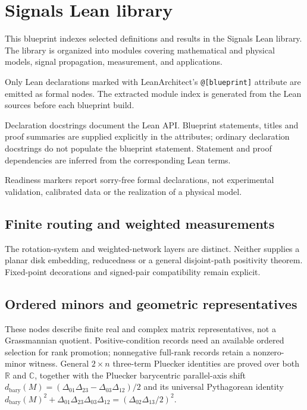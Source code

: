 \chapter{Signals Lean library}

This blueprint indexes selected definitions and results in the Signals Lean
library. The library is organized into modules covering mathematical and
physical models, signal propagation, measurement, and applications.

Only Lean declarations marked with LeanArchitect's \texttt{@[blueprint]}
attribute are emitted as formal nodes. The extracted module index is generated
from the Lean sources before each blueprint build.

Declaration docstrings document the Lean API. Blueprint statements, titles and
proof summaries are supplied explicitly in the attributes; ordinary declaration
docstrings do not populate the blueprint statement. Statement and proof
dependencies are inferred from the corresponding Lean terms.

Readiness markers report sorry-free formal declarations, not experimental
validation, calibrated data or the realization of a physical model.






\section{Finite routing and weighted measurements}

The rotation-system and weighted-network layers are distinct. Neither supplies
a planar disk embedding, reducedness or a general disjoint-path positivity
theorem. Fixed-point decorations and signed-pair compatibility remain explicit.


\section{Ordered minors and geometric representatives}

These nodes describe finite real and complex matrix representatives, not a
Grassmannian quotient. Positive-condition records need an available ordered
selection for rank promotion; nonnegative full-rank records retain a
nonzero-minor witness. General $2\times n$ three-term Pluecker identities are
proved over both $\mathbb R$ and $\mathbb C$, together with the Pluecker
barycentric parallel-axis shift
$d_{\mathrm{bary}}(M)=(\Delta_{01}\Delta_{23}-\Delta_{03}\Delta_{12})/2$ and
its universal Pythagorean identity
$d_{\mathrm{bary}}(M)^2+\Delta_{01}\Delta_{23}\Delta_{03}\Delta_{12}=(\Delta_{02}\Delta_{13}/2)^2$.

